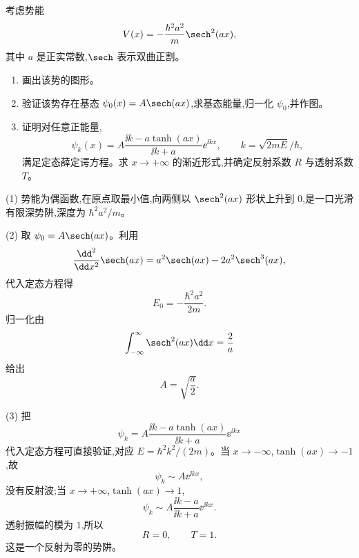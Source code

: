 \begin{question}
考虑势能
\[
V(x)=-\frac{\hbar^2a^2}{m}\sech^2(ax),
\]
其中 $a$ 是正实常数,$\sech$ 表示双曲正割。
\begin{enumerate}
\item 画出该势的图形。
\item 验证该势存在基态 $\psi_0(x)=A\sech(ax)$,求基态能量,归一化 $\psi_0$,并作图。
\item 证明对任意正能量,
\[
\psi_k(x)=A\frac{\ii k-a\tanh(ax)}{\ii k+a}\ee^{\ii kx},\qquad k=\sqrt{2mE}/\hbar,
\]
满足定态薛定谔方程。求 $x\to+\infty$ 的渐近形式,并确定反射系数 $R$ 与透射系数 $T$。
\end{enumerate}
\end{question}
\begin{solution}
(1) 势能为偶函数,在原点取最小值,向两侧以 $\sech^2(ax)$ 形状上升到 $0$,是一口光滑有限深势阱,深度为 $\hbar^2a^2/m$。

(2) 取 $\psi_0=A\sech(ax)$。利用
\[
\frac{\dd^2}{\dd x^2}\sech(ax)=a^2\sech(ax)-2a^2\sech^3(ax),
\]
代入定态方程得
\[
E_0=-\frac{\hbar^2a^2}{2m}.
\]
归一化由
\[
\int_{-\infty}^{\infty}\sech^2(ax)\dd x=\frac2a
\]
给出
\[
A=\sqrt{\frac a2}.
\]

(3) 把
\[
\psi_k=A\frac{\ii k-a\tanh(ax)}{\ii k+a}\ee^{\ii kx}
\]
代入定态方程可直接验证,对应 $E=\hbar^2k^2/(2m)$。当 $x\to-\infty$,$\tanh(ax)\to-1$,故
\[
\psi_k\sim A\ee^{\ii kx},
\]
没有反射波;当 $x\to+\infty$,$\tanh(ax)\to1$,
\[
\psi_k\sim A\frac{\ii k-a}{\ii k+a}\ee^{\ii kx}.
\]
透射振幅的模为 $1$,所以
\[
R=0,
\qquad T=1.
\]
这是一个反射为零的势阱。
\end{solution}

